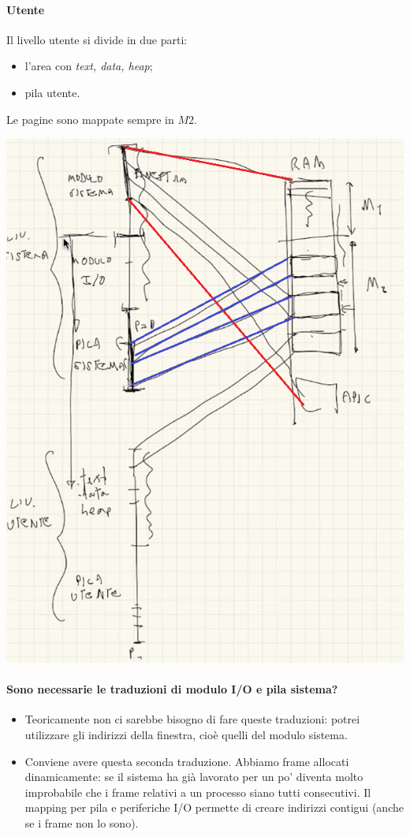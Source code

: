 \documentclass[11pt]{report}
\theoremstyle{definition}
\begin{document}
	\paragraph{Utente}
	Il livello utente si divide in due parti:
	\begin{itemize}
		\item l'area con \emph{text, data, heap};
		\item pila utente.
	\end{itemize}
Le pagine sono mappate sempre in $M2$.
\begin{center}
	\includegraphics[scale=.6]{img/245.PNG}
\end{center}
\paragraph{Sono necessarie le traduzioni di modulo I/O e pila sistema?} 
\begin{itemize}
	\item Teoricamente non ci sarebbe bisogno di fare queste traduzioni: potrei utilizzare gli indirizzi della finestra, cioè quelli del modulo sistema.
	\item Conviene avere questa seconda traduzione. Abbiamo frame allocati dinamicamente: se il sistema ha già lavorato per un po' diventa molto improbabile che i frame relativi a un processo siano tutti consecutivi. Il mapping per pila e periferiche I/O permette di creare indirizzi contigui (anche se i frame non lo sono). 
\end{itemize} 
\end{document}
